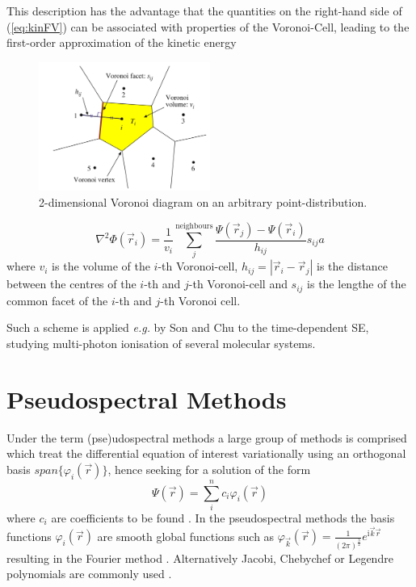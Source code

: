 This description has the advantage that the quantities on the right-hand side of (\ref{eq:kinFV}) can be associated with properties of the Voronoi-Cell, leading to the first-order approximation of the kinetic energy
\begin{figure}
   \includegraphics[width=0.5\textwidth]{Figures/VoronoiFD}
   \caption{2-dimensional Voronoi diagram on an arbitrary point-distribution. \cite{Son_Chu}}
   \label{fig:VorCell}
\end{figure}
\begin{equation}\label{eq:kinVoron}
   \nabla^2\Phi(\vec{r}_i)=\frac{1}{v_i} \sum_j^\text{neighbours} \frac{\Psi(\vec{r}_j)-\Psi(\vec{r}_i)}{h_{ij}} s_{ij}a
\end{equation}
where $v_i$ is the volume of the $i$-th Voronoi-cell, $h_{ij}=|\vec{r}_i-\vec{r}_j|$ is the distance between the centres of the $i$-th and $j$-th Voronoi-cell and $s_{ij}$ is the lengthe of the common facet of the $i$-th and $j$-th Voronoi cell.

Such a scheme is applied \textit{e.g.} by Son and Chu \cite{Son_Chu0, Son_Chu} to the time-dependent SE, studying multi-photon ionisation of several molecular systems.

\section{Pseudospectral Methods}
\label{ch:dvr}
Under the term (pse)udospectral methods a large group of methods is comprised which treat the differential equation of interest variationally using an orthogonal basis $span\{\varphi_i(\vec{r})\}$, hence seeking for a solution of the form
\begin{equation}
\Psi(\vec{r})=\sum_i^n c_i \varphi_i(\vec{r})
\end{equation}
where $c_i$ are coefficients to be found \cite{SpectMeth}.
In the pseudospectral methods the basis functions $\varphi_i(\vec{r})$ are smooth global functions such as $\varphi_{\vec{k}}(\vec{r})=\frac{1}{(2\pi)^\frac 32 }e^{\text{i}\vec{k}\vec{r}}$ resulting in the Fourier method \cite{Fourier}.
Alternatively Jacobi, Chebychef or Legendre polynomials are commonly used \cite{PSbook}.

